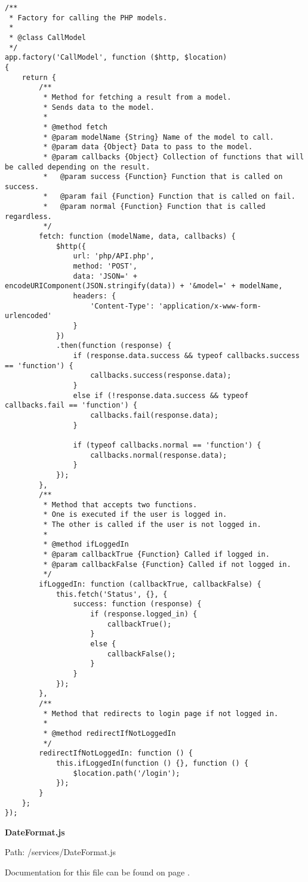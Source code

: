 {\scriptsize
\begin{lstlisting}
/**
 * Factory for calling the PHP models.
 *
 * @class CallModel
 */
app.factory('CallModel', function ($http, $location)
{
	return {
		/**
		 * Method for fetching a result from a model.
		 * Sends data to the model.
		 *
		 * @method fetch
		 * @param modelName {String} Name of the model to call.
		 * @param data {Object} Data to pass to the model.
		 * @param callbacks {Object} Collection of functions that will be called depending on the result.
		 *   @param success {Function} Function that is called on success.
		 *   @param fail {Function} Function that is called on fail.
		 *   @param normal {Function} Function that is called regardless.
		 */
		fetch: function (modelName, data, callbacks) {
			$http({
				url: 'php/API.php',
				method: 'POST',
				data: 'JSON=' + encodeURIComponent(JSON.stringify(data)) + '&model=' + modelName,
				headers: {
					'Content-Type': 'application/x-www-form-urlencoded'
				}
			})
			.then(function (response) {
				if (response.data.success && typeof callbacks.success == 'function') {
					callbacks.success(response.data);
				}
				else if (!response.data.success && typeof callbacks.fail == 'function') {
					callbacks.fail(response.data);
				}

				if (typeof callbacks.normal == 'function') {
					callbacks.normal(response.data);
				}
			});
		},
		/**
		 * Method that accepts two functions.
		 * One is executed if the user is logged in.
		 * The other is called if the user is not logged in.
		 *
		 * @method ifLoggedIn
		 * @param callbackTrue {Function} Called if logged in.
		 * @param callbackFalse {Function} Called if not logged in.
		 */
		ifLoggedIn: function (callbackTrue, callbackFalse) {
			this.fetch('Status', {}, {
				success: function (response) {
					if (response.logged_in) {
						callbackTrue();
					}
					else {
						callbackFalse();
					}
				}
			});
		},
		/**
		 * Method that redirects to login page if not logged in.
		 *
		 * @method redirectIfNotLoggedIn
		 */
		redirectIfNotLoggedIn: function () {
			this.ifLoggedIn(function () {}, function () {
				$location.path('/login');
			});
		}
	};
});\end{lstlisting}
}
\textbf{DateFormat.js}\label{DateFormat.js}

Path: /services/DateFormat.js

Documentation for this file can be found on page \pageref{DateFormat.js.doc}.

